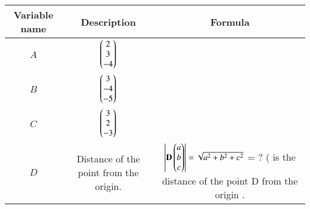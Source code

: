 \begin{tabular}[12pt]{|c|c|c|}
    \hline
    \textbf{Variable name} & \textbf{Description} & \textbf{Formula}\\ 
    \hline
		$A$ & $\begin{pmatrix}2 \\ 3 \\ -4\end{pmatrix}$ &  \\
    \hline 
		$B$ & $\begin{pmatrix}3 \\ -4 \\ -5\end{pmatrix}$ & \\
    \hline
		$C$ & $\begin{pmatrix}3 \\ 2 \\ -3\end{pmatrix}$ &   \\
    \hline   
	$D$ & Distance of the point from the origin. &  $\left\vert\mathbf{D}\begin{pmatrix}a\\b\\c\end{pmatrix}\right\vert=\sqrt{a^2+b^2+c^2}$ = ? (\since \abs{D} is the distance of the point D from the origin . \\
	\hline
\end{tabular}


